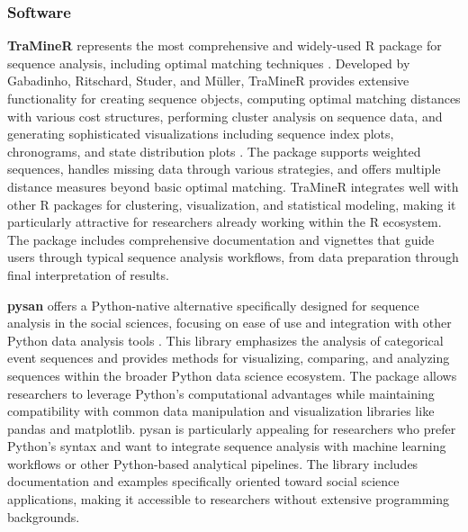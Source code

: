 \documentclass[../main.tex]{subfiles}
\begin{document}
\subsubsection{Software}


\textbf{TraMineR} represents the most comprehensive and widely-used R package for sequence analysis, including optimal matching techniques \parencite{traminer_documentation}. Developed by Gabadinho, Ritschard, Studer, and Müller, TraMineR provides extensive functionality for creating sequence objects, computing optimal matching distances with various cost structures, performing cluster analysis on sequence data, and generating sophisticated visualizations including sequence index plots, chronograms, and state distribution plots \parencite{traminer_documentation}. The package supports weighted sequences, handles missing data through various strategies, and offers multiple distance measures beyond basic optimal matching. TraMineR integrates well with other R packages for clustering, visualization, and statistical modeling, making it particularly attractive for researchers already working within the R ecosystem. The package includes comprehensive documentation and vignettes that guide users through typical sequence analysis workflows, from data preparation through final interpretation of results.


\textbf{pysan} offers a Python-native alternative specifically designed for sequence analysis in the social sciences, focusing on ease of use and integration with other Python data analysis tools \parencite{pysan_github}. This library emphasizes the analysis of categorical event sequences and provides methods for visualizing, comparing, and analyzing sequences within the broader Python data science ecosystem. The package allows researchers to leverage Python's computational advantages while maintaining compatibility with common data manipulation and visualization libraries like pandas and matplotlib. pysan is particularly appealing for researchers who prefer Python's syntax and want to integrate sequence analysis with machine learning workflows or other Python-based analytical pipelines. The library includes documentation and examples specifically oriented toward social science applications, making it accessible to researchers without extensive programming backgrounds.

\end{document}
